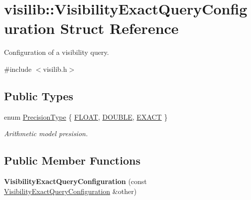 \hypertarget{structvisilib_1_1_visibility_exact_query_configuration}{}\section{visilib\+::Visibility\+Exact\+Query\+Configuration Struct Reference}
\label{structvisilib_1_1_visibility_exact_query_configuration}


Configuration of a visibility query. 




{\ttfamily \#include $<$visilib.\+h$>$}

\subsection*{Public Types}
\begin{DoxyCompactItemize}
\item 
enum \mbox{\hyperlink{structvisilib_1_1_visibility_exact_query_configuration_a1cd44b0dffc3d51eb0bd5af35eeb9a8b}{Precision\+Type}} \{ \mbox{\hyperlink{structvisilib_1_1_visibility_exact_query_configuration_a1cd44b0dffc3d51eb0bd5af35eeb9a8ba804621a91ffab216263ead381509cbb9}{F\+L\+O\+AT}}, 
\mbox{\hyperlink{structvisilib_1_1_visibility_exact_query_configuration_a1cd44b0dffc3d51eb0bd5af35eeb9a8bae6d683564c0978e72ac4b6be27998aa5}{D\+O\+U\+B\+LE}}, 
\mbox{\hyperlink{structvisilib_1_1_visibility_exact_query_configuration_a1cd44b0dffc3d51eb0bd5af35eeb9a8bad3b9971ac7b554145ebb1ee55bdd97c7}{E\+X\+A\+CT}}
 \}
\begin{DoxyCompactList}\small\item\em Arithmetic model presision. \end{DoxyCompactList}\end{DoxyCompactItemize}
\subsection*{Public Member Functions}
\begin{DoxyCompactItemize}
\item 
\mbox{\label{structvisilib_1_1_visibility_exact_query_configuration_af680434fd7a78d6eab1c94e5ff1806ed}} 
{\bfseries Visibility\+Exact\+Query\+Configuration} (const \mbox{\hyperlink{structvisilib_1_1_visibility_exact_query_configuration}{Visibility\+Exact\+Query\+Configuration}} \&other)
\end{DoxyCompactItemize}
